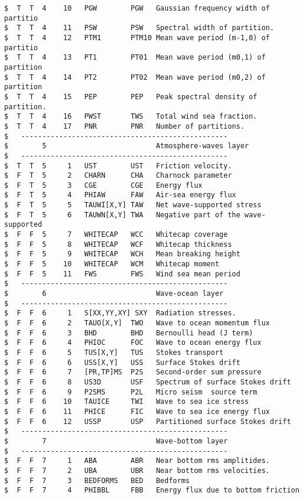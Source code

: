 \begin{footnotesize}
\begin{verbatim}
$  T  T  4    10   PGW        PGW   Gaussian frequency width of partitio
$  T  T  4    11   PSW        PSW   Spectral width of partition.
$  T  T  4    12   PTM1       PTM10 Mean wave period (m-1,0) of partitio
$  T  T  4    13   PT1        PT01  Mean wave period (m0,1) of partition
$  T  T  4    14   PT2        PT02  Mean wave period (m0,2) of partition
$  T  T  4    15   PEP        PEP   Peak spectral density of partition.
$  T  T  4    16   PWST       TWS   Total wind sea fraction.
$  T  T  4    17   PNR        PNR   Number of partitions.
$   -------------------------------------------------
$        5                          Atmosphere-waves layer
$   -------------------------------------------------
$  T  T  5     1   UST        UST   Friction velocity.
$  F  T  5     2   CHARN      CHA   Charnock parameter
$  F  T  5     3   CGE        CGE   Energy flux
$  F  T  5     4   PHIAW      FAW   Air-sea energy flux
$  F  T  5     5   TAUWI[X,Y] TAW   Net wave-supported stress
$  F  T  5     6   TAUWN[X,Y] TWA   Negative part of the wave-supported 
$  F  F  5     7   WHITECAP   WCC   Whitecap coverage
$  F  F  5     8   WHITECAP   WCF   Whitecap thickness
$  F  F  5     9   WHITECAP   WCH   Mean breaking height
$  F  F  5    10   WHITECAP   WCM   Whitecap moment
$  F  F  5    11   FWS        FWS   Wind sea mean period
$   -------------------------------------------------
$        6                          Wave-ocean layer 
$   -------------------------------------------------
$  F  F  6     1   S[XX,YY,XY] SXY  Radiation stresses.
$  F  F  6     2   TAUO[X,Y]  TWO   Wave to ocean momentum flux
$  F  F  6     3   BHD        BHD   Bernoulli head (J term) 
$  F  F  6     4   PHIOC      FOC   Wave to ocean energy flux
$  F  F  6     5   TUS[X,Y]   TUS   Stokes transport
$  F  F  6     6   USS[X,Y]   USS   Surface Stokes drift
$  F  F  6     7   [PR,TP]MS  P2S   Second-order sum pressure 
$  F  F  6     8   US3D       USF   Spectrum of surface Stokes drift
$  F  F  6     9   P2SMS      P2L   Micro seism  source term
$  F  F  6    10   TAUICE     TWI   Wave to sea ice stress
$  F  F  6    11   PHICE      FIC   Wave to sea ice energy flux
$  F  F  6    12   USSP       USP   Partitioned surface Stokes drift
$   -------------------------------------------------
$        7                          Wave-bottom layer 
$   -------------------------------------------------
$  F  F  7     1   ABA        ABR   Near bottom rms amplitides.
$  F  F  7     2   UBA        UBR   Near bottom rms velocities.
$  F  F  7     3   BEDFORMS   BED   Bedforms
$  F  F  7     4   PHIBBL     FBB   Energy flux due to bottom friction 

\end{verbatim}
\end{footnotesize}
